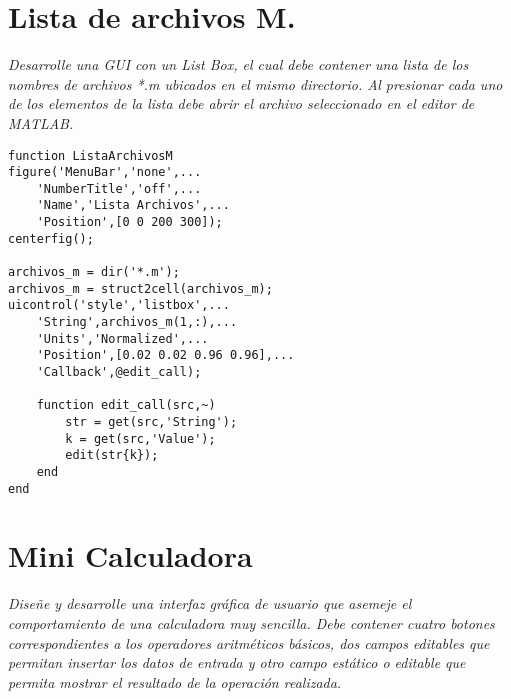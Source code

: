 \section{Lista de archivos M.}

\textit{Desarrolle una GUI con un List Box, el cual debe contener una lista de los nombres de archivos *.m ubicados en el mismo directorio. Al presionar cada uno de los elementos de la lista debe abrir el archivo seleccionado en el editor de MATLAB.}

\sol

\begin{verbatim}
function ListaArchivosM
figure('MenuBar','none',...
    'NumberTitle','off',...
    'Name','Lista Archivos',...
    'Position',[0 0 200 300]);
centerfig();
 
archivos_m = dir('*.m');
archivos_m = struct2cell(archivos_m);
uicontrol('style','listbox',...
    'String',archivos_m(1,:),...
    'Units','Normalized',...
    'Position',[0.02 0.02 0.96 0.96],...
    'Callback',@edit_call);
 
    function edit_call(src,~)
        str = get(src,'String');
        k = get(src,'Value');
        edit(str{k});
    end
end
\end{verbatim}

\section{Mini Calculadora}

\textit{Diseñe y desarrolle una interfaz gráfica de usuario que asemeje el comportamiento de una calculadora muy sencilla. Debe contener cuatro botones correspondientes a los operadores aritméticos básicos, dos campos editables que permitan insertar los datos de entrada y otro campo estático o editable que permita mostrar el resultado de la operación realizada.}

\sol

